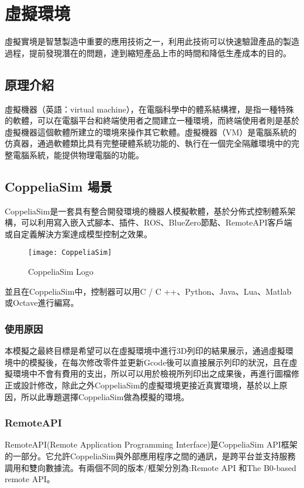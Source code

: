 \chapter{虛擬環境}

虛擬實境是智慧製造中重要的應用技術之一，利用此技術可以快速驗證產品的製造過程，提前發現潛在的問題，達到縮短產品上市的時間和降低生產成本的目的。\\

\section{原理介紹}

虛擬機器（英語：virtual machine），在電腦科學中的體系結構裡，是指一種特殊的軟體，可以在電腦平台和終端使用者之間建立一種環境，而終端使用者則是基於虛擬機器這個軟體所建立的環境來操作其它軟體。虛擬機器（VM）是電腦系統的仿真器，通過軟體類比具有完整硬體系統功能的、執行在一個完全隔離環境中的完整電腦系統，能提供物理電腦的功能。\\

\section{CoppeliaSim 場景}
 CoppeliaSim是一套具有整合開發環境的機器人模擬軟體，基於分佈式控制體系架構，可以利用寫入嵌入式腳本、插件、ROS、BlueZero節點、RemoteAPI客戶端或自定義解決方案達成模型控制之效果。\\
\begin{figure}
\center
\texttt{[image: CoppeliaSim]}
\caption{\Large CoppeliaSim Logo}
\end{figure}

並且在CoppeliaSim中，控制器可以用C / C ++、Python、Java、Lua、Matlab或Octave進行編寫。\\
\subsection{使用原因}
 本模擬之最終目標是希望可以在虛擬環境中進行3D列印的結果展示，通過虛擬環境中的模擬後，在每次修改零件並更新Gcode後可以直接展示列印的狀況，且在虛擬環境中不會有費用的支出，所以可以用於檢視所列印出之成果後，再進行圖檔修正或設計修改，除此之外CoppeliaSim的虛擬環境更接近真實環境，基於以上原因，所以此專題選擇CoppeliaSim做為模擬的環境。\\
\subsection{RemoteAPI}
 RemoteAPI(Remote Application Programming Interface)是CoppeliaSim API框架的一部分。它允許CoppeliaSim與外部應用程序之間的通訊，是跨平台並支持服務調用和雙向數據流。有兩個不同的版本/框架分別為:Remote API 和The B0-based remote API。\\
